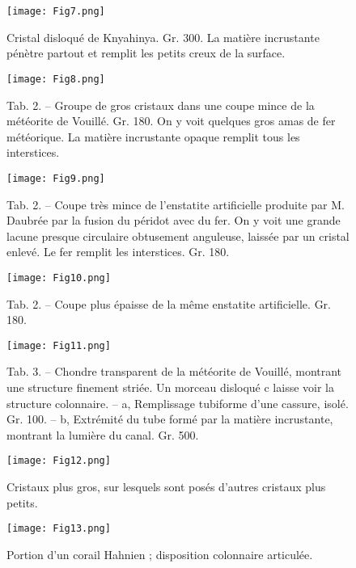 \documentclass[a4paper, 12pt, oneside, french]{article}
\begin{document}
\clearpage
\begin{figure}[b]
\centering
\texttt{[image: Fig7.png]}
\caption{Cristal disloqué de Knyahinya. Gr. 300. La matière incrustante pénètre partout et remplit les petits creux de la surface.}
\end{figure}
\clearpage
\begin{figure}[b]
\texttt{[image: Fig8.png]}
\caption{Tab. 2. – Groupe de gros cristaux dans une coupe mince de la météorite de Vouillé. Gr. 180. On y voit quelques gros amas de fer météorique. La matière incrustante opaque remplit tous les interstices.}
\centering
\end{figure}
\clearpage
\begin{figure}[b]
\texttt{[image: Fig9.png]}
\caption{Tab. 2. – Coupe très mince de l'enstatite artificielle produite par M. Daubrée par la fusion du péridot avec du fer. On y voit une grande lacune presque circulaire obtusement anguleuse, laissée par un cristal enlevé. Le fer remplit les interstices. Gr. 180.}
\centering
\end{figure}
\clearpage
\begin{figure}[b]
\texttt{[image: Fig10.png]}
\caption{Tab. 2. – Coupe plus épaisse de la même enstatite artificielle. Gr. 180.}
\centering
\end{figure}
\clearpage
\begin{figure}[b]
\texttt{[image: Fig11.png]}
\caption{Tab. 3. – Chondre transparent de la météorite de Vouillé, montrant une structure finement striée. Un morceau disloqué c laisse voir la structure colonnaire. – a, Remplissage tubiforme d'une cassure, isolé. Gr. 100. – b, Extrémité du tube formé par la matière incrustante, montrant la lumière du canal. Gr. 500.}
\centering
\end{figure}
\clearpage
{}
\begin{figure}[b]
\centering
\texttt{[image: Fig12.png]}
\caption{Cristaux plus gros, sur lesquels sont posés d'autres cristaux plus petits.}
\end{figure}
\clearpage
\begin{figure}[b]
\centering
\texttt{[image: Fig13.png]}
\caption{Portion d'un corail Hahnien ; disposition colonnaire articulée.}
\end{figure}
\end{document}
